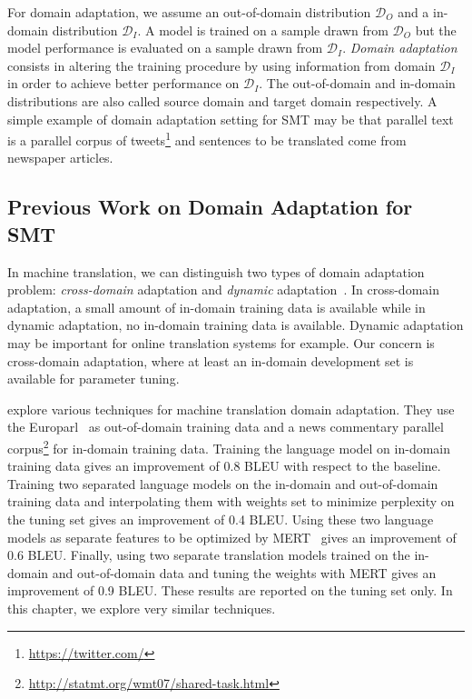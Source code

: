 For domain adaptation, we assume an out-of-domain distribution
$\mathcal{D}_O$ and a in-domain distribution $\mathcal{D}_I$.
A model is trained on
a sample drawn from $\mathcal{D}_O$ but the model performance
is evaluated on a sample drawn from $\mathcal{D}_I$.
\emph{Domain adaptation} consists in altering the training procedure
by using information from domain
$\mathcal{D}_I$ in order to achieve better performance on $\mathcal{D}_I$.
The out-of-domain and in-domain distributions are also called
source domain and target domain respectively.
A simple example of domain adaptation setting for SMT may be that
parallel text is a parallel corpus of
tweets\footnote{\url{https://twitter.com/}} and sentences to be translated
come from newspaper articles.

\subsection{Previous Work on Domain Adaptation for SMT}
\label{sec:domainAdaptationSMTrelatedWork}



In machine translation, we can distinguish two types of domain
adaptation problem: \emph{cross-domain} adaptation and \emph{dynamic}
adaptation~\citep{foster-kuhn:2007:WMT}. In cross-domain adaptation,
a small amount of in-domain training data is available while
in dynamic adaptation, no in-domain training data is available.
Dynamic adaptation may be important for online translation systems for example.
Our concern is cross-domain adaptation, where at least an in-domain
development set is available for parameter tuning.

\citet{koehn-schroeder:2007:WMT} explore various techniques for
machine translation domain adaptation. They use the
Europarl~\citep{koehn:2005:MTSummit} as out-of-domain
training data and a news commentary parallel
corpus\footnote{\url{http://statmt.org/wmt07/shared-task.html}}
for in-domain training data. Training the language model
on in-domain training data gives an improvement of 0.8 BLEU
with respect to the baseline. Training two separated language models
on the in-domain and out-of-domain training data and interpolating
them with weights set to minimize perplexity on the tuning set
gives an improvement of 0.4 BLEU. Using these two language models
as separate features to be optimized by MERT~\citep{och:2003:ACL}
gives an improvement of 0.6 BLEU. Finally, using two separate
translation models trained on the in-domain and out-of-domain
data and tuning the weights with MERT gives an improvement
of 0.9 BLEU. These results are reported on the tuning set only.
In this chapter, we explore very similar techniques.

